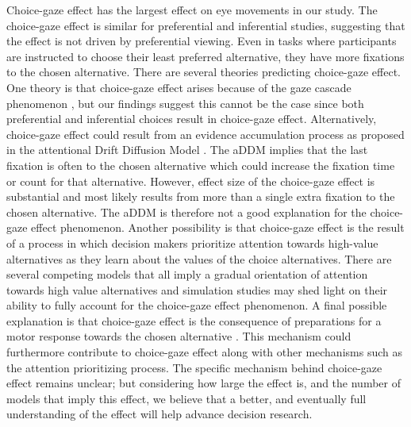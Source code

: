 Choice-gaze effect has the largest effect on eye movements in our study. The choice-gaze effect is similar for preferential and inferential studies, suggesting that the effect is not driven by preferential viewing. Even in tasks where participants are instructed to choose their least preferred alternative, they have more fixations to the chosen alternative. There are several theories predicting choice-gaze effect. One theory is that choice-gaze effect arises because of the gaze cascade phenomenon \citep{shimojo2003a}, but our findings suggest this cannot be the case since both preferential and inferential choices result in choice-gaze effect. Alternatively, choice-gaze effect could result from an evidence accumulation process as proposed in the attentional Drift Diffusion Model \citep{krajbich2010a}. The aDDM implies that the last fixation is often to the chosen alternative which could increase the fixation time or count for that alternative. However, effect size of the choice-gaze effect is substantial and most likely results from more than a single extra fixation to the chosen alternative. The aDDM is therefore not a good explanation for the choice-gaze effect phenomenon. Another possibility is that choice-gaze effect is the result of a process in which decision makers prioritize attention towards high-value alternatives as they learn about the values of the choice alternatives. There are several competing models that all imply a gradual orientation of attention towards high value alternatives \citep{callaway2019a, gloeckner2011a, manohar2013} and simulation studies may shed light on their ability to fully account for the choice-gaze effect phenomenon. A final possible explanation is that choice-gaze effect is the consequence of preparations for a motor response towards the chosen alternative \citep{hayhoe2014a}. This mechanism could furthermore contribute to choice-gaze effect along with other mechanisms such as the attention prioritizing process. The specific mechanism behind choice-gaze effect remains unclear; but considering how large the effect is, and the number of models that imply this effect, we believe that a better, and eventually full understanding of the effect will help advance decision research.\\ 

